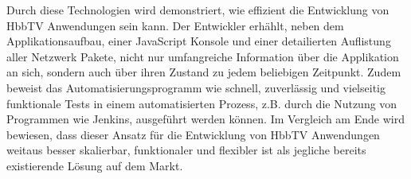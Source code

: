 Durch diese Technologien wird demonstriert, wie effizient die Entwicklung von HbbTV Anwendungen
sein kann. Der Entwickler erhählt, neben dem Applikationsaufbau, einer JavaScript Konsole und
einer detailierten Auflistung aller Netzwerk Pakete, nicht nur umfangreiche Information über
die Applikation an sich, sondern auch über ihren Zustand zu jedem beliebigen Zeitpunkt. Zudem
beweist das Automatisierungsprogramm wie schnell, zuverlässig und vielseitig funktionale Tests
in einem automatisierten Prozess, z.B. durch die Nutzung von Programmen wie Jenkins, ausgeführt
werden können. Im Vergleich am Ende wird bewiesen, dass dieser Ansatz für die Entwicklung von
HbbTV Anwendungen weitaus besser skalierbar, funktionaler und flexibler ist als jegliche bereits
existierende Lösung auf dem Markt.
